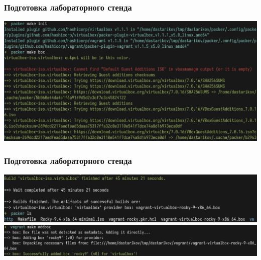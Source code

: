 \begin{frame}
\frametitle{Подготовка лабораторного стенда}
        \centering
    \includegraphics[width=\textwidth]{../images/img2.png}
\end{frame}

\begin{frame}
\frametitle{Подготовка лабораторного стенда}
        \centering
        \includegraphics[width=\textwidth]{../images/img3.png}
        \centering
        \includegraphics[width=\textwidth]{../images/img4.png}
\end{frame}


